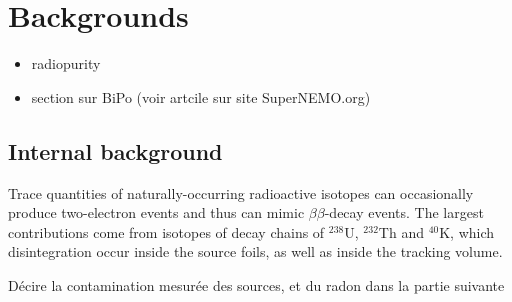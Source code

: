 \section{Backgrounds}
\label{sec:SNbkg}

\begin{itemize}
\item radiopurity
\item section sur BiPo (voir artcile sur site SuperNEMO.org)
\end{itemize}

\subsection{Internal background}
\label{subsec:SNbkg_internal}

Trace quantities of naturally-occurring radioactive isotopes can occasionally produce two-electron events and thus can mimic $\beta\beta$-decay events.
The largest contributions come from isotopes of decay chains of $^{238}$U, $^{232}$Th and $^{40}$K, which disintegration occur inside the source foils, as well as inside the tracking volume.

Décire la contamination mesurée des sources, et du radon dans la partie suivante

